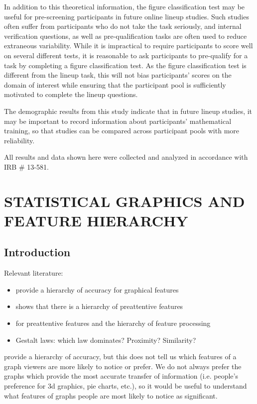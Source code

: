 \documentclass[11pt]{isuthesis}\usepackage[]{graphicx}\usepackage[]{color}
\begin{document}
In addition to this theoretical information, the figure classification test may be useful for pre-screening participants in future online lineup studies.
Such studies often suffer from participants who do not take the task seriously, and internal verification questions, as well as pre-qualification tasks are often used to reduce extraneous variability.
While it is impractical to require participants to score well on several different tests, it is reasonable to ask participants to pre-qualify for a task by completing a figure classification test.
As the figure classification test is different from the lineup task, this will not bias participants' scores on the domain of interest while ensuring that the participant pool is sufficiently motivated to complete the lineup questions.

The demographic results from this study indicate that in future lineup studies, it may be important to record information about participants' mathematical training, so that studies can be compared across participant pools with more reliability. 

All results and data shown here were collected and analyzed in accordance with IRB \# 13-581.

\chapter{STATISTICAL GRAPHICS AND FEATURE HIERARCHY}\label{featurehierarchy}


\graphicspath{{Figure/FeatureHierarchy/}{Images/FeatureHierarchy/}}
\renewcommand{\floatpagefraction}{.99}



\section{Introduction}
Relevant literature:
\begin{itemize}
\item \citet{cleveland:1984,cleveland:1985} provide a hierarchy of accuracy for graphical features
\item \citet{healey1996high} shows that there is a hierarchy of preattentive features
\item \citet{treisman1985preattentive} for preattentive features and the hierarchy of feature processing
\item Gestalt laws: which law dominates? Proximity? Similarity?
\end{itemize}

\citet{cleveland:1985} provide a hierarchy of accuracy, but this does not tell us which features of a graph viewers are more likely to notice or prefer. We do not always prefer the graphs which provide the most accurate transfer of information (i.e. people's preference for 3d graphics, pie charts, etc.), so it would be useful to understand what features of graphs people are most likely to notice as significant. 
\end{document}
